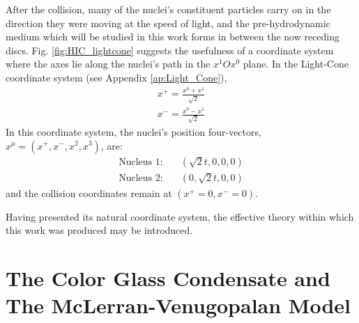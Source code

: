 After the collision, many of the nuclei's constituent particles
carry on in the direction they were moving at the speed of light, and the pre-hydrodynamic medium which will be studied in this work forms in between the now receding discs.
Fig. \ref{fig:HIC_lightcone} suggests the usefulness of a coordinate system where the axes lie along the nuclei's path in the $x^1Ox^0$ plane. In the Light-Cone coordinate system (see Appendix \ref{ap:Light_Cone}), 
\begin{subequations}
\begin{gather}
x^+ = \frac{x^0+x^1}{\sqrt{2}} \\
x^- = \frac{x^0-x^1}{\sqrt{2}}
\end{gather}
\end{subequations}
In this coordinate system, the nuclei's position four-vectors, $x^\mu=(x^+,x^-,x^2,x^3)$, are:
\begin{equation*}
\begin{split}
	\text{Nucleus 1}:& \quad (\sqrt{2}t,0,0,0) \\
	\text{Nucleus 2}:& \quad (0,\sqrt{2}t,0,0)
\end{split}
\end{equation*}
and the collision coordinates remain at $(x^+=0,x^-=0)$.

Having presented its natural coordinate system, the effective theory within which this work was produced may be introduced.




\section{The Color Glass Condensate and The McLerran-Venugopalan Model}

